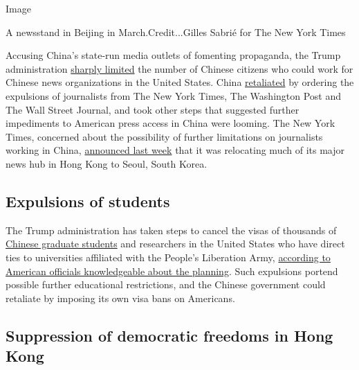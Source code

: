 Image

A newsstand in Beijing in March.Credit...Gilles Sabrié for The New York
Times

Accusing China's state-run media outlets of fomenting propaganda, the
Trump administration
\href{https://www.nytimes3xbfgragh.onion/2020/03/02/world/asia/china-journalists-diplomats-expulsion.html}{sharply
limited} the number of Chinese citizens who could work for Chinese news
organizations in the United States. China
\href{https://www.nytimes3xbfgragh.onion/2020/03/17/business/media/china-expels-american-journalists.html?searchResultPosition=2}{retaliated}
by ordering the expulsions of journalists from The New York Times, The
Washington Post and The Wall Street Journal, and took other steps that
suggested further impediments to American press access in China were
looming. The New York Times, concerned about the possibility of further
limitations on journalists working in China,
\href{https://www.nytimes3xbfgragh.onion/2020/07/14/business/media/new-york-times-hong-kong.html?searchResultPosition=1}{announced
last week} that it was relocating much of its major news hub in Hong
Kong to Seoul, South Korea.

\hypertarget{expulsions-of-students}{%
\subsection{Expulsions of students}\label{expulsions-of-students}}

The Trump administration has taken steps to cancel the visas of
thousands of
\href{https://www.nytimes3xbfgragh.onion/2017/12/12/opinion/chinese-students-mental-health.html}{Chinese
graduate students} and researchers in the United States who have direct
ties to universities affiliated with the People's Liberation Army,
\href{https://www.nytimes3xbfgragh.onion/2020/05/28/us/politics/china-hong-kong-trump-student-visas.html}{according
to American officials knowledgeable about the planning}. Such expulsions
portend possible further educational restrictions, and the Chinese
government could retaliate by imposing its own visa bans on Americans.

\hypertarget{suppression-of-democratic-freedoms-in-hong-kong}{%
\subsection{Suppression of democratic freedoms in Hong
Kong}\label{suppression-of-democratic-freedoms-in-hong-kong}}

